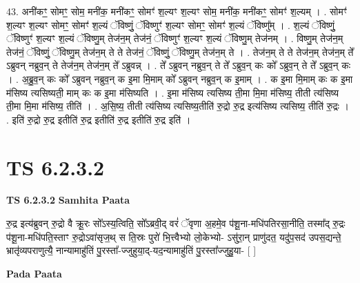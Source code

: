 \documentclass[17pt]{extarticle}
\begin{document}
43. अनी॑कꣳ॒॒ सोमꣳ॒॒ सोम॒ मनी॑क॒ मनी॑कꣳ॒॒ सोमꣳ॑ श॒ल्यꣳ श॒ल्यꣳ सोम॒ मनी॑क॒ मनी॑कꣳ॒॒ सोमꣳ॑ श॒ल्यम् । . सोमꣳ॑ श॒ल्यꣳ श॒ल्यꣳ सोमꣳ॒॒ सोमꣳ॑ श॒ल्यं ॅविष्णुं॒ ॅविष्णुꣳ॑ श॒ल्यꣳ सोमꣳ॒॒ सोमꣳ॑ श॒ल्यं ॅविष्णु᳚म् । . श॒ल्यं ॅविष्णुं॒ ॅविष्णुꣳ॑ श॒ल्यꣳ श॒ल्यं ॅविष्णु॒म् तेज॑न॒म् तेज॑नं॒ ॅविष्णुꣳ॑ श॒ल्यꣳ श॒ल्यं ॅविष्णु॒म् तेज॑नम् । . विष्णु॒म् तेज॑न॒म् तेज॑नं॒ ॅविष्णुं॒ ॅविष्णु॒म् तेज॑न॒म् ते ते तेज॑नं॒ ॅविष्णुं॒ ॅविष्णु॒म् तेज॑न॒म् ते । . तेज॑न॒म् ते ते तेज॑न॒म् तेज॑न॒म् ते᳚ ऽब्रुवन् नब्रुव॒न् ते तेज॑न॒म् तेज॑न॒म् ते᳚ ऽब्रुवन्न् । . ते᳚ ऽब्रुवन् नब्रुव॒न् ते ते᳚ ऽब्रुव॒न् कः को᳚ ऽब्रुव॒न् ते ते᳚ ऽब्रुव॒न् कः । . अ॒ब्रु॒व॒न् कः को᳚ ऽब्रुवन् नब्रुव॒न् क इ॒मा मि॒माम् को᳚ ऽब्रुवन् नब्रुव॒न् क इ॒माम् । . क इ॒मा मि॒माम् कः क इ॒मा म॑सिष्य त्यसिष्यती॒ माम् कः क इ॒मा म॑सिष्यति । . इ॒मा म॑सिष्य त्यसिष्य ती॒मा मि॒मा म॑सिष्य॒ तीती त्य॑सिष्य ती॒मा मि॒मा म॑सिष्य॒ तीति॑ । . अ॒सि॒ष्य॒ तीती त्य॑सिष्य त्यसिष्य॒तीति॑ रु॒द्रो रु॒द्र इत्य॑सिष्य त्यसिष्य॒ तीति॑ रु॒द्रः । . इति॑ रु॒द्रो रु॒द्र इतीति॑ रु॒द्र इतीति॑ रु॒द्र इतीति॑ रु॒द्र इति॑ । \newline
\pagebreak
{}

\section{ TS 6.2.3.2 }

\textbf{TS 6.2.3.2 } \newline
\textbf{Samhita Paata} \newline

रु॒द्र इत्य॑ब्रुवन् रु॒द्रो वै क्रू॒रः सो᳚ऽस्य॒त्विति॒ सो᳚ऽब्रवी॒द् वरं॑ ॅवृणा अ॒हमे॒व प॑शू॒ना-मधि॑पतिरसा॒नीति॒ तस्मा᳚द् रु॒द्रः प॑शू॒ना-मधि॑पति॒स्ताꣳ रु॒द्रोऽवा॑सृज॒थ् स ति॒स्रः पुरो॑ भि॒त्त्वैभ्यो लो॒केभ्यो- ऽसु॑रा॒न् प्राणु॑दत॒ यदु॑प॒सद॑ उपस॒द्यन्ते॒ भ्रातृ॑व्यपराणुत्यै॒ नान्यामाहु॑तिं पु॒रस्ता᳚-ज्जुहुया॒द्-यद॒न्यामाहु॑तिं पु॒रस्ता᳚ज्जुहु॒या- [  ] \newline

\textbf{Pada Paata} \newline
\end{document}
